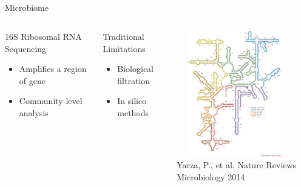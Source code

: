 \documentclass[11pt]{beamer}
\begin{document}
\subsection{}

	
	\begin{frame}{Microbiome}
	\begin{columns}
	\begin{block}{16S Ribosomal RNA Sequencing}
	\begin{itemize}
		\item Amplifies a region of gene
		\item Community level analysis 
	\end{itemize}
	\end{block}
		
		
	\begin{block}{Traditional Limitations}
	\begin{itemize}
		\item Biological filtration
		\item In silico methods
	\end{itemize}
	\end{block}
	
	\includegraphics[height=5.5cm, width=5cm]{ribosome.jpg} \\
	\tiny{Yarza, P., et al. Nature Reviews Microbiology 2014}
	\end{columns}
		
	
	\end{frame}
\end{document}
